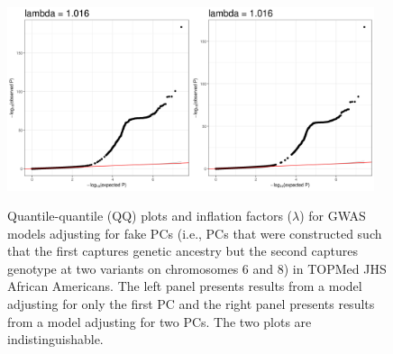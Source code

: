 \documentclass[12pt]{article}
\begin{document}
\begin{figure}[!htb]
\centering
\includegraphics[width=0.48\textwidth]{figs/finalfigs/figS13a_beta2_1pcs_fake_qq}\includegraphics[width=0.48\textwidth]{figs/finalfigs/figS13b_beta2_2pcs_fake_qq}
\caption[QQ plots for GWAS models adjusting for fake PCs in TOPMed JHS.]{Quantile-quantile (QQ) plots and inflation factors ($\lambda$) for GWAS models adjusting for fake PCs (i.e., PCs that were constructed such that the first captures genetic ancestry but the second captures genotype at two variants on chromosomes 6 and 8) in TOPMed JHS African Americans. The left panel presents results from a model adjusting for only the first PC and the right panel presents results from a model adjusting for two PCs. The two plots are indistinguishable.}
\label{fig:qq-fake}
\end{figure}





\end{document}
